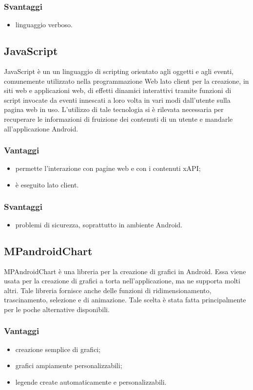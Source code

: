 \documentclass[../Tesi.tex]{subfiles}
\begin{document}
		\subsubsection{Svantaggi}
			\begin{itemize}
				\item linguaggio verboso.
			\end{itemize}

	\subsection{JavaScript}
		JavaScript è un un linguaggio di scripting orientato agli oggetti e agli eventi, comunemente utilizzato nella programmazione Web lato client per la creazione, in siti web e applicazioni web, di effetti dinamici interattivi tramite funzioni di script invocate da eventi innescati a loro volta in vari modi dall'utente sulla pagina web in uso. L'utilizzo di tale tecnologia si è rilevata necessaria per recuperare le informazioni di fruizione dei contenuti di un utente e mandarle all'applicazione Android. 
		\subsubsection{Vantaggi}
			\begin{itemize}
				\item permette l'interazione con pagine web e con i contenuti xAPI;
				\item è eseguito lato client.
			\end{itemize}
		\subsubsection{Svantaggi}
			\begin{itemize}
				\item problemi di sicurezza, soprattutto in ambiente Android.
			\end{itemize}

	\subsection{MPandroidChart}
		MPAndroidChart è una libreria per la creazione di grafici in Android. Essa viene usata per la creazione di grafici a torta nell'applicazione, ma ne supporta molti altri. Tale libreria fornisce anche delle funzioni di ridimensionamento, trascinamento, selezione e di animazione. Tale scelta è stata fatta principalmente per le poche alternative disponibili.
		\subsubsection{Vantaggi}
			\begin{itemize}
				\item creazione semplice di grafici;
				\item grafici ampiamente personalizzabili;
				\item legende create automaticamente e personalizzabili.
			\end{itemize}
\end{document}
